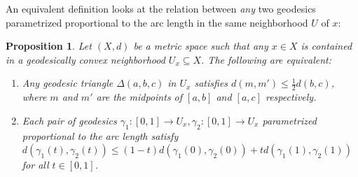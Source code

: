 \documentclass[11pt, a4paper, oneside]{memoir}
\theoremstyle{plain}\newtheorem{theorem}[subsection]{Theorem}
\newtheorem{proposition}[subsection]{Proposition}
\theoremstyle{definition}
\newcommand{\parenum}{\setenumerate[1]{label=\textbf{(\arabic*)}}}
\begin{document}
An equivalent definition looks at the relation between \emph{any} two geodesics parametrized proportional to the arc length in the same neighborhood \(U\) of \(x\):
\begin{proposition}\label{prop:conv_mid}
Let \((X,d)\) be a metric space such that any \(x\in X\) is contained in a geodesically convex neighborhood \(U_x\subseteq X\). The following are equivalent:
\parenum
\begin{enumerate}
    \item Any geodesic triangle \(\Delta(a,b,c)\) in \(U_x\) satisfies \(d(m,m')\leq\frac{1}{2}d(b,c)\), where \(m\) and \(m'\) are the midpoints of \([a,b]\) and \([a,c]\) respectively.
    \item Each pair of geodesics \(\gamma_1:[0,1]\to U_x,\gamma_2:[0,1]\to U_x\) parametrized proportional to the arc length satisfy \(d(\gamma_1(t),\gamma_2(t))\leq (1-t)d(\gamma_1(0),\gamma_2(0))+td(\gamma_1(1),\gamma_2(1))\) for all \(t\in[0,1]\).
\end{enumerate}
\end{proposition}
\end{document}

